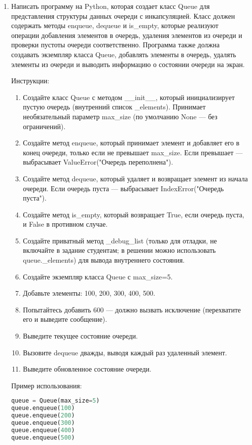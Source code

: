\begin{enumerate}
\item Написать программу на Python, которая создает класс Queue для представления структуры данных очереди с инкапсуляцией. Класс должен содержать методы enqueue, dequeue и is\_empty, которые реализуют операции добавления элементов в очередь, удаления элементов из очереди и проверки пустоты очереди соответственно. Программа также должна создавать экземпляр класса Queue, добавлять элементы в очередь, удалять элементы из очереди и выводить информацию о состоянии очереди на экран.

Инструкции:
\begin{enumerate}
    \item Создайте класс Queue с методом \_\_init\_\_, который инициализирует пустую очередь (внутренний список \_elements). Принимает необязательный параметр max\_size (по умолчанию None — без ограничений).
    \item Создайте метод enqueue, который принимает элемент и добавляет его в конец очереди, только если не превышает max\_size. Если превышает — выбрасывает ValueError("Очередь переполнена").
    \item Создайте метод dequeue, который удаляет и возвращает элемент из начала очереди. Если очередь пуста — выбрасывает IndexError("Очередь пуста").
    \item Создайте метод is\_empty, который возвращает True, если очередь пуста, и False в противном случае.
    \item Создайте приватный метод \_debug\_list (только для отладки, не включайте в задание студентам; в решении можно использовать queue.\_elements) для вывода внутреннего состояния.
    \item Создайте экземпляр класса Queue с max\_size=5.
    \item Добавьте элементы: 100, 200, 300, 400, 500.
    \item Попытайтесь добавить 600 — должно вызвать исключение (перехватите его и выведите сообщение).
    \item Выведите текущее состояние очереди.
    \item Вызовите dequeue дважды, выводя каждый раз удаленный элемент.
    \item Выведите обновленное состояние очереди.
\end{enumerate}

Пример использования:
\begin{lstlisting}[language=Python]
queue = Queue(max_size=5)
queue.enqueue(100)
queue.enqueue(200)
queue.enqueue(300)
queue.enqueue(400)
queue.enqueue(500)


\end{lstlisting}
\end{enumerate}

